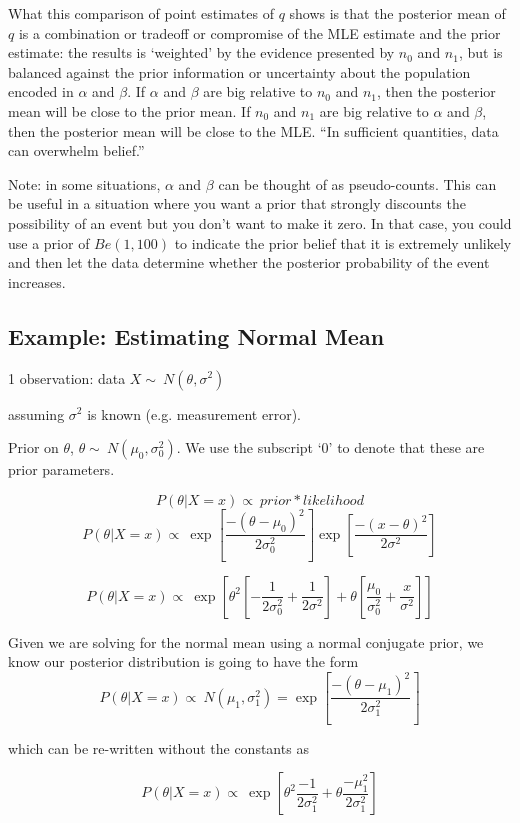\documentclass[12pt]{article}
\begin{document}
What this comparison of point estimates of $q$ shows is that the posterior mean of $q$ is a combination or tradeoff or compromise of the MLE estimate and the prior estimate: the results is `weighted' by the evidence presented by $n_0$ and $n_1$, but is balanced against the prior information or uncertainty about the population encoded in $\alpha$ and $\beta$. If $\alpha$ and $\beta$ are big relative to $n_0$ and $n_1$, then the posterior mean will be close to the prior mean. If $n_0$ and $n_1$ are big relative to $\alpha$ and $\beta$, then the posterior mean will be close to the MLE. ``In sufficient quantities, data can overwhelm belief.''

Note: in some situations, $\alpha$ and $\beta$ can be thought of as pseudo-counts. This can be useful in a situation where you want a prior that strongly discounts the possibility of an event but you don't want to make it zero. In that case, you could use a prior of $Be(1,100)$ to indicate the prior belief that it is extremely unlikely and then let the data determine whether the posterior probability of the event increases.

\subsection{Example: Estimating Normal Mean}

1 observation: data $X \sim\ N(\theta,\sigma^2)$

assuming $\sigma^2$ is known (e.g. measurement error).

Prior on $\theta$, $\theta \sim\ N(\mu_0,\sigma_0^2)$. We use the subscript `0' to denote that these are prior parameters.

\[
P(\theta|X=x) \propto\ prior * likelihood
\]
\[
P(\theta|X=x) \propto\ \exp{[\frac{-(\theta - \mu_0)^2}{2 \sigma_0^2}]} \exp{[\frac{-(x - \theta)^2}{2 \sigma^2}]}
\]


\[
P(\theta|X=x) \propto\ \exp{[\theta^2 [-\frac{1}{2\sigma_0^2}+\frac{1}{2\sigma^2}] + \theta[\frac{\mu_0}{\sigma_0^2}+\frac{x}{\sigma^2}]]}
\]

Given we are solving for the normal mean using a normal conjugate prior, we know our posterior distribution is going to have the form
\[
P(\theta|X=x) \propto\ N(\mu_1,\sigma_1^2) = \exp{[\frac{-(\theta - \mu_1)^2}{2 \sigma_1^2}]}
\]

which can be re-written without the constants as

\[
P(\theta|X=x) \propto\  \exp{[\theta^2\frac{-1}{2 \sigma_1^2}+\theta \frac{-\mu_1^2}{2 \sigma_1^2}]}
\]
\end{document}
